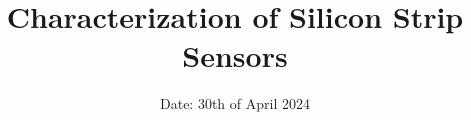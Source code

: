 

\title{Characterization of Silicon Strip Sensors}
\date{%
  Date: 30th of April 2024
}




\maketitle
\thispagestyle{empty}
\tableofcontents
\newpage






\printbibliography{}

\appendix
\newpage



